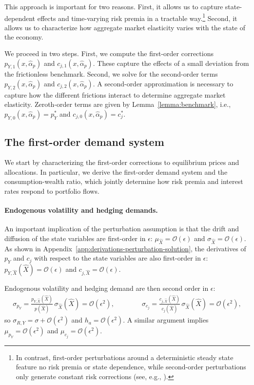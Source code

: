 \documentclass[12pt,english]{article}
\begin{document}
This approach is important for two reasons.
First, it allows us to capture state-dependent effects and time-varying risk premia in a tractable way.\footnote{In contrast, first-order perturbations around a deterministic steady state feature no risk premia or state dependence, while second-order perturbations only generate constant risk corrections (see, e.g., \citealt{schmitt2004solving}).}
Second, it allows us to characterize how aggregate market elasticity varies with the state of the economy.

We proceed in two steps.
First, we compute the first-order corrections $p_{Y,1}(x, \hat{\alpha}_p)$ and $c_{j,1}(x, \hat{\alpha}_p)$.
These capture the effects of a small deviation from the frictionless benchmark.
Second, we solve for the second-order terms $p_{Y,2}(x, \hat{\alpha}_p)$ and $c_{j,2}(x, \hat{\alpha}_p)$.
A second-order approximation is necessary to capture how the different frictions interact to determine aggregate market elasticity.
Zeroth-order terms are given by Lemma~\ref{lemma:benchmark}, i.e., $p_{Y,0}(x, \hat{\alpha}_p)=p_Y^{*}$ and $c_{j,0}(x, \hat{\alpha}_p)=c_j^{*}$.


\subsection{The first-order demand system}

We start by characterizing the first-order corrections to equilibrium prices and allocations.
In particular, we derive the first-order demand system and the consumption-wealth ratio, which jointly determine how risk premia and interest rates respond to portfolio flows.

\paragraph{Endogenous volatility and hedging demands.}
An important implication of the perturbation assumption is that the drift and diffusion of the state variables are first-order in $\epsilon$: $\mu_{\hat{X}} = \mathcal{O}(\epsilon)$ and $\sigma_{\hat{X}} = \mathcal{O}(\epsilon)$.
As shown in Appendix~\ref{app:derivations-perturbation-solution}, the derivatives of $p_{Y}$ and $c_{j}$ with respect to the state variables are also first-order in $\epsilon$:
$p_{Y,\hat{X}}(\hat{X}) = \mathcal{O}(\epsilon)$ and $c_{j, \hat{X}} = \mathcal{O}(\epsilon)$.

Endogenous volatility and hedging demand are then second order in $\epsilon$:
\begin{align}
    \sigma_{p_Y}=\frac{p_{Y,\hat{X}}(\hat{X})}{p(\hat{X})}\,\sigma_{\hat{X}}(\hat{X})=\mathcal{O}(\epsilon^2),  \qquad \qquad 
    \sigma_{c_j}=\frac{c_{j,\hat{X}}(\hat{X})}{c_j(\hat{X})}\,\sigma_{\hat{X}}(\hat{X})=\mathcal{O}(\epsilon^2),
\end{align}
so $\sigma_{R,Y} = \sigma + \mathcal{O}(\epsilon^2)$ and $h_a = \mathcal{O}(\epsilon^2)$. A similar argument implies $\mu_{p_Y} = \mathcal{O}(\epsilon^2)$ and $\mu_{c_j} = \mathcal{O}(\epsilon^2)$.
\end{document}
